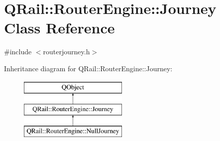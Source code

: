 \hypertarget{classQRail_1_1RouterEngine_1_1Journey}{}\section{Q\+Rail\+::Router\+Engine\+::Journey Class Reference}
\label{classQRail_1_1RouterEngine_1_1Journey}


{\ttfamily \#include $<$routerjourney.\+h$>$}

Inheritance diagram for Q\+Rail\+::Router\+Engine\+::Journey\+:\begin{figure}[H]
\begin{center}
\leavevmode
\includegraphics[height=3.000000cm]{classQRail_1_1RouterEngine_1_1Journey}
\end{center}
\end{figure}
